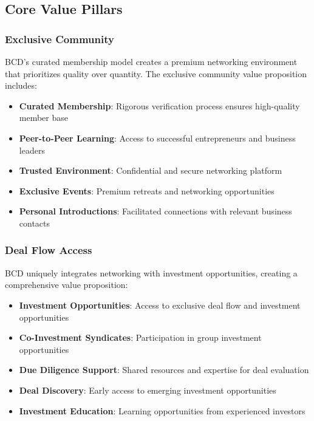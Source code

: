 \subsection{Core Value Pillars}

\subsubsection{Exclusive Community}
BCD's curated membership model creates a premium networking environment that prioritizes quality over quantity. The exclusive community value proposition includes:

\begin{itemize}
    \item \textbf{Curated Membership}: Rigorous verification process ensures high-quality member base
    \item \textbf{Peer-to-Peer Learning}: Access to successful entrepreneurs and business leaders
    \item \textbf{Trusted Environment}: Confidential and secure networking platform
    \item \textbf{Exclusive Events}: Premium retreats and networking opportunities
    \item \textbf{Personal Introductions}: Facilitated connections with relevant business contacts
\end{itemize}

\subsubsection{Deal Flow Access}
BCD uniquely integrates networking with investment opportunities, creating a comprehensive value proposition:

\begin{itemize}
    \item \textbf{Investment Opportunities}: Access to exclusive deal flow and investment opportunities
    \item \textbf{Co-Investment Syndicates}: Participation in group investment opportunities
    \item \textbf{Due Diligence Support}: Shared resources and expertise for deal evaluation
    \item \textbf{Deal Discovery}: Early access to emerging investment opportunities
    \item \textbf{Investment Education}: Learning opportunities from experienced investors
\end{itemize}

